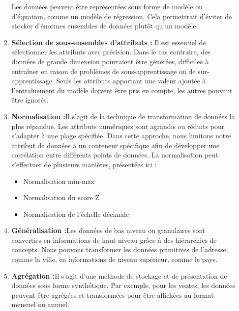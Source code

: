 \documentclass[a4paper, 12pt]{article}
\begin{document}
\begin{itemize}
\begin{enumerate}
			Les données peuvent être représentées sous forme de modèle ou d'équation, comme un modèle de régression. Cela permettrait d'éviter de stocker d'énormes ensembles de données plutôt qu'un modèle.
			\item {\textbf{Sélection de sous-ensembles d'attributs :}}
			Il est essentiel de sélectionner les attributs avec précision. Dans le cas contraire, des données de grande dimension pourraient être générées, difficiles à entraîner en raison de problèmes de sous-apprentissage ou de sur-apprentissage. Seuls les attributs apportant une valeur ajoutée à l'entraînement du modèle doivent être pris en compte, les autres pouvant être ignorés.
			\item {\textbf{Normalisation :}}Il s'agit de la technique de transformation de données la plus répandue. Les attributs numériques sont agrandis ou réduits pour s'adapter à une plage spécifiée. Dans cette approche, nous limitons notre attribut de données à un conteneur spécifique afin de développer une corrélation entre différents points de données. La normalisation peut s'effectuer de plusieurs manières, présentées ici :
			\begin{itemize}
				\item 	Normalisation min-max
				\item Normalisation du score Z
				\item Normalisation de l'échelle décimale
			\end{itemize}
			\item {\textbf{Généralisation :}}Les données de bas niveau ou granulaires sont converties en informations de haut niveau grâce à des hiérarchies de concepts. Nous pouvons transformer les données primitives de l'adresse, comme la ville, en informations de niveau supérieur, comme le pays.
			\item {\textbf{Agrégation :}}Il s'agit d'une méthode de stockage et de présentation de données sous forme synthétique. Par exemple, pour les ventes, les données peuvent être agrégées et transformées pour être affichées au format mensuel ou annuel.
			

\end{enumerate}
\end{itemize}
\end{document}
